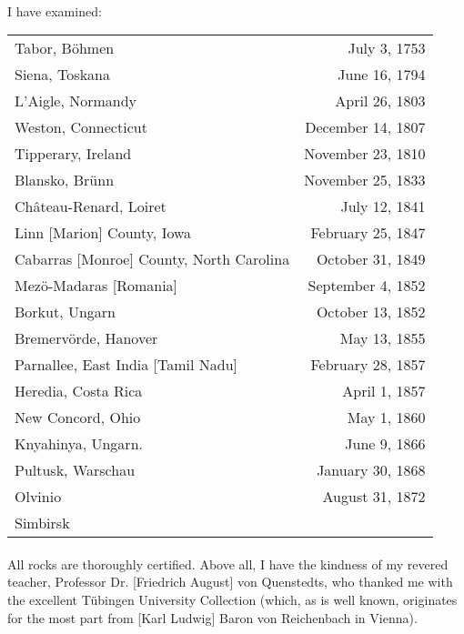 \documentclass[a4paper, 11pt, oneside]{article}
\begin{document}
\paragraph{}
I have examined:
\begin{center}
\begin{tabular}{ l r }
 Tabor, Böhmen & July 3, 1753 \\
 Siena, Toskana & June 16, 1794 \\
 L'Aigle, Normandy & April 26, 1803 \\
 Weston, Connecticut & December 14, 1807 \\
 Tipperary, Ireland & November 23, 1810 \\
 Blansko, Brünn & November 25, 1833 \\
 Château-Renard, Loiret & July 12, 1841 \\
 Linn [Marion] County, Iowa & February 25, 1847 \\
 Cabarras [Monroe] County, North Carolina & October 31, 1849 \\
 Mezö-Madaras [Romania] & September 4, 1852 \\
 Borkut, Ungarn & October 13, 1852 \\
 Bremervörde, Hanover & May 13, 1855 \\
 Parnallee, East India [Tamil Nadu] & February 28, 1857 \\
 Heredia, Costa Rica & April 1, 1857 \\
 New Concord, Ohio & May 1, 1860 \\
 Knyahinya, Ungarn. & June 9, 1866 \\
 Pultusk, Warschau & January 30, 1868 \\
 Olvinio & August 31, 1872 \\
 Simbirsk & \\
\end{tabular}
\end{center}
\clearpage
\paragraph{}
\begin{sloppypar}
All rocks are thoroughly certified. Above all, I have the kindness of my revered teacher, Professor Dr. [Friedrich August] von Quenstedts, who thanked me with the excellent Tübingen University Collection (which, as is well known, originates for the most part from [Karl Ludwig] Baron von Reichenbach in Vienna).
\end{sloppypar}
\end{document}
